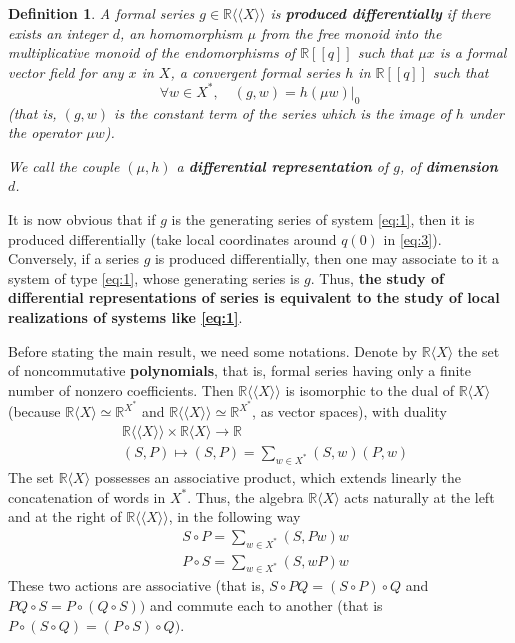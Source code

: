 \documentclass[a4paper,12pt]{article}
\newtheorem{definition}{Definition}
\newcommand{\R}{\mathbb{R}}
\newcommand{\Rx}{\R\langle X\rangle}
\newcommand{\Rxx}{\R\langle\langle X\rangle\rangle}
\begin{document}
\begin{definition}
	A formal series $g \in \Rxx$ is \textbf{produced differentially} if there exists an integer $d$, an homomorphism $\mu$ from the free monoid into the multiplicative monoid of the endomorphisms of $\R[[q]]$ such that $\mu {x}$ is a formal vector field for any $x$ in $X$, a convergent formal series $h$ in $\R[[q]]$ such that
	\begin{equation*}
		\forall w \in X^*, \quad (g, w)=\left.h(\mu w)\right|_0
	\end{equation*}
	(that is, $({g}, {w})$ is the constant term of the series which is the image of ${h}$ under the operator $\mu w$).
	
	We call the couple $(\mu, h)$ a \textbf{differential representation} of $g$, of \textbf{dimension}~$d$.
\end{definition}

It is now obvious that if ${g}$ is the generating series of system \eqref{eq:1}, then it is produced differentially (take local coordinates around ${q}(0)$ in \eqref{eq:3}). Conversely, if a series ${g}$ is produced differentially, then one may associate to it a system of type \eqref{eq:1}, whose generating series is ${g}$. Thus, \textbf{the study of differential representations of series is equivalent to the study of local realizations of systems like \eqref{eq:1}}.

Before stating the main result, we need some notations. Denote by $\Rx$ the set of noncommutative \textbf{polynomials}, that is, formal series having only a finite number of nonzero coefficients. Then $\Rxx$ is isomorphic to the dual of $\Rx$ (because $\Rx \simeq \R^{X^*}$ and $\Rxx \simeq \R^{X^*}$, as vector spaces), with duality
\begin{equation*}
	\begin{aligned}
		& \Rxx \times \Rx \to \R \\
		& (S, P) \mapsto (S, P)=\sum_{w \in X^*} (S, w) (P, w)
	\end{aligned}
\end{equation*}
The set $\Rx$ possesses an associative product, which extends linearly the concatenation of words in $X^*$. Thus, the algebra $\Rx$ acts naturally at the left and at the right of $\Rxx$, in the following way
\begin{equation} \label{eq:4}
	\begin{aligned}
		& S \circ P=\sum_{w \in X^*}(S, P w) w \\
		& P \circ S=\sum_{w \in X^*}(S, w P) w
	\end{aligned}
\end{equation}
These two actions are associative (that is, $S \circ P Q=(S \circ P) \circ Q$ and ${PQ} \circ {S}={P} \circ({Q} \circ {S}))$ and commute each to another (that is ${P} \circ({S} \circ {Q})=({P} \circ {S}) \circ {Q})$. 
\end{document}
